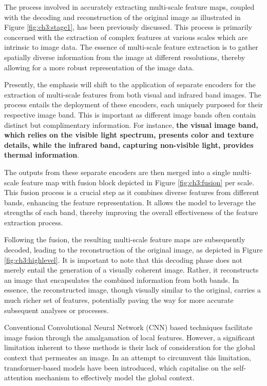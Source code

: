 The process involved in accurately extracting multi-scale feature maps, coupled with the decoding and reconstruction of the original image as illustrated in Figure \ref{fig:ch3:stage1}, has been previously discussed. This process is primarily concerned with the extraction of complex features at various scales which are intrinsic to image data. The essence of multi-scale feature extraction is to gather spatially diverse information from the image at different resolutions, thereby allowing for a more robust representation of the image data.

Presently, the emphasis will shift to the application of separate encoders for the extraction of multi-scale features from both visual and infrared band images. The process entails the deployment of these encoders, each uniquely purposed for their respective image band. This is important as different image bands often contain distinct but complimentary information. For instance, \textbf{the visual image band, which relies on the visible light spectrum, presents color and texture details, while the infrared band, capturing non-visible light, provides thermal information}.

The outputs from these separate encoders are then merged into a single multi-scale feature map with fusion block depicted in Figure \ref{fig:ch3:fusion} per scale. This fusion process is a crucial step as it combines diverse features from different bands, enhancing the feature representation. It allows the model to leverage the strengths of each band, thereby improving the overall effectiveness of the feature extraction process.

Following the fusion, the resulting multi-scale feature maps are subsequently decoded, leading to the reconstruction of the original image, as depicted in Figure \ref{fig:ch3:highlevel}. It is important to note that this decoding phase does not merely entail the generation of a visually coherent image. Rather, it reconstructs an image that encapsulates the combined information from both bands. In essence, the reconstructed image, though visually similar to the original, carries a much richer set of features, potentially paving the way for more accurate subsequent analyses or processes.

Conventional Convolutional Neural Network (CNN) based techniques facilitate image fusion through the amalgamation of local features. However, a significant limitation inherent to these methods is their lack of consideration for the global context that permeates an image. In an attempt to circumvent this limitation, transformer-based models have been introduced, which capitalise on the self-attention mechanism to effectively model the global context.

